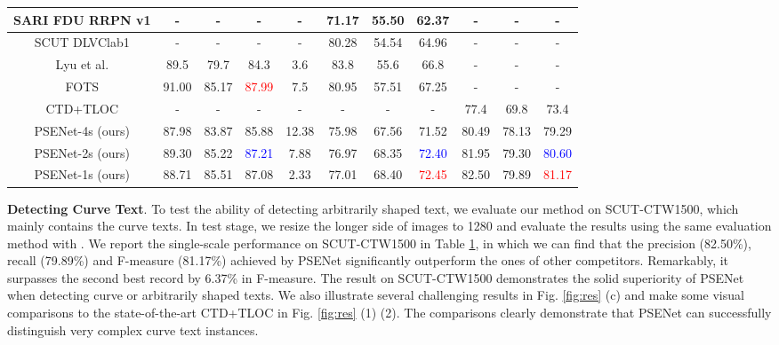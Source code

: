 \documentclass{article}
\begin{document}
\begin{table}[h]
{\begin{tabular}{c|c|c|c|c|c|c|c|c|c|c}
			\hline
			SARI FDU RRPN v1 \cite{icdar2017mlt} & - & - & - & - & 71.17 & 55.50 & 62.37 & - & - & - \\
			\hline
			SCUT DLVClab1 \cite{icdar2017mlt} & - & - & - & - & 80.28 & 54.54 & 64.96 & - & - & - \\
			\hline
			Lyu et al. \cite{lyu2018multi} & 89.5 & 79.7 & 84.3 & 3.6 & 83.8 & 55.6 & 66.8 & - & - & - \\
			\hline
			FOTS \cite{liu2018fots} & 91.00 & 85.17 & \textcolor{red}{87.99} & 7.5 & 80.95 & 57.51 & 67.25 & - & - & - \\
			\hline
			CTD+TLOC \cite{Liu2017Detecting} & - & - & - & - & - & - & - & 77.4 & 69.8 & 73.4 \\
			\hline
			\hline
			PSENet-4s (ours) & 87.98 & 83.87 & 85.88 & 12.38 & 75.98 & 67.56 & 71.52 & 80.49 & 78.13 & 79.29 \\
			\hline
			PSENet-2s (ours)& 89.30 & 85.22 & \textcolor{blue}{87.21} & 7.88 & 76.97 & 68.35 & \textcolor{blue}{72.40} & 81.95 & 79.30 & \textcolor{blue}{80.60} \\
			\hline
			PSENet-1s (ours)& 88.71 & 85.51 & 87.08 & 2.33 & 77.01 & 68.40 & \textcolor{red}{72.45} & 82.50 & 79.89 & \textcolor{red}{81.17} \\
			\hline
			
	\end{tabular}}
	\label{tab:ic-ctw}
\end{table}

\textbf{Detecting Curve Text}. To test the ability of detecting arbitrarily shaped text, we evaluate our method on SCUT-CTW1500, which mainly contains the curve texts. In test stage, we resize the longer side of images to 1280 and evaluate the results using the same evaluation method with \cite{Liu2017Detecting}. We report the single-scale performance on SCUT-CTW1500 in Table \ref{tab:ic-ctw}, in which we can find that the precision (82.50\%), recall (79.89\%) and F-measure (81.17\%) achieved by PSENet significantly outperform the ones of other competitors. Remarkably, it surpasses the second best record by 6.37\% in F-measure. The result on SCUT-CTW1500 demonstrates the solid superiority of PSENet when detecting curve or arbitrarily shaped texts. We also illustrate several challenging results in Fig. \ref{fig:res} (c) and make some visual comparisons to the state-of-the-art CTD+TLOC \cite{Liu2017Detecting} in Fig. \ref{fig:res} (1) (2). The comparisons clearly demonstrate that PSENet can successfully distinguish very complex curve text instances. 
\end{document}
